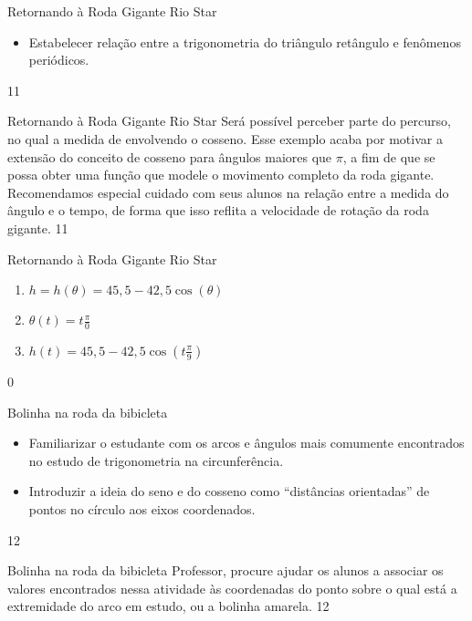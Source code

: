 \begin{objectives}{Retornando à Roda Gigante Rio Star}
{
\begin{itemize}
\item Estabelecer relação entre a trigonometria do triângulo retângulo e fenômenos periódicos.
\end{itemize}
}{1}{1}
\end{objectives}
\marginpar{\vspace{-1em}}
\begin{sugestions}{Retornando à Roda Gigante Rio Star}
{
Será possível perceber parte do percurso, no qual a medida de envolvendo o cosseno. Esse exemplo acaba por motivar a extensão do conceito de cosseno para ângulos maiores que $\pi$, a fim de que se possa obter uma função que modele o movimento completo da roda gigante. Recomendamos especial cuidado com seus alunos na relação entre a medida do ângulo e o tempo, de forma que isso reflita a velocidade de rotação da roda gigante.
}{1}1{}
\end{sugestions}
\begin{answer}{Retornando à Roda Gigante Rio Star}
{
\begin{enumerate}
\item $h=h(\theta)=45{,}5-42{,}5\cos(\theta)$
\item $\theta(t)=t\frac{\pi}{0}$
\item $h(t)=45{,}5-42{,}5\cos(t\frac{\pi}{9})$
\end{enumerate}
}{0}
\end{answer}
\clearmargin
\begin{objectives}{Bolinha na roda da bibicleta}
{
\begin{itemize}
\item Familiarizar o estudante com os arcos e ângulos mais comumente encontrados no estudo de trigonometria na circunferência.
\item Introduzir a ideia do seno e do cosseno como “distâncias orientadas”{} de pontos no círculo aos eixos coordenados.
\end{itemize}
}{1}{2}
\end{objectives}
\begin{sugestions}{Bolinha na roda da bibicleta}
{
Professor, procure ajudar os alunos a associar os valores encontrados nessa atividade às coordenadas do ponto sobre o qual está a extremidade do arco em estudo, ou a bolinha amarela.
}{1}{2}
\end{sugestions}
\clearmargin
